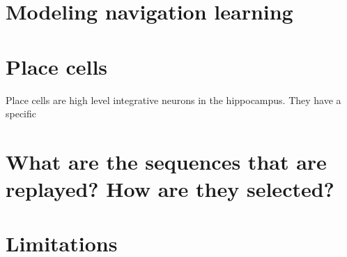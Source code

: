 \documentclass[]{report}
\begin{document}
\section{Modeling navigation
learning}\label{modeling-navigation-learning}

\section{Place cells}\label{place-cells}
Place cells are high level integrative neurons in the hippocampus. They have a specific

\section{What are the sequences that are replayed? How are they
selected?}\label{what-are-the-sequences-that-are-replayed-how-are-they-selected}

\section{Limitations}\label{limitations}




\end{document}
